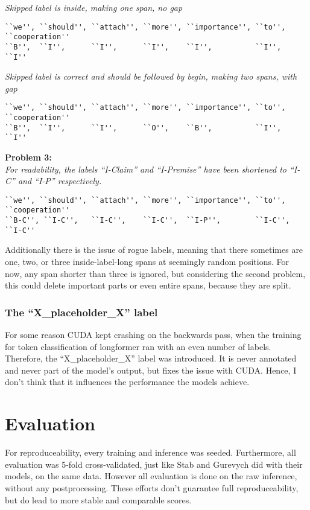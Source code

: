 \documentclass[12]{article}
\theoremstyle{mytheoremstyle}
\theoremstyle{mytheoremstyle}
\theoremstyle{myproblemstyle}
\begin{document}
  \vspace{-4ex}
  \textit{Skipped label is inside, making one span, no gap}
  \vspace{-1.5ex}
  \begin{verbatim}
``we'', ``should'', ``attach'', ``more'', ``importance'', ``to'', ``cooperation''
``B'',  ``I'',      ``I'',      ``I'',    ``I'',          ``I'',  ``I''
  \end{verbatim}
  \vspace{-4ex}
  \textit{Skipped label is correct and should be followed by begin, making two spans, with gap}
  \vspace{-1.5ex}
  \begin{verbatim}
``we'', ``should'', ``attach'', ``more'', ``importance'', ``to'', ``cooperation''
``B'',  ``I'',      ``I'',      ``O'',    ``B'',          ``I'',  ``I''
  \end{verbatim}
  \vspace{-4ex}
  \textbf{Problem 3:}\\
  \textit{For readability, the labels ``I-Claim'' and ``I-Premise'' have been shortened to ``I-C'' and ``I-P'' respectively.}
  \vspace{-1.5ex}
  \begin{verbatim}
``we'', ``should'', ``attach'', ``more'', ``importance'', ``to'', ``cooperation''
``B-C'', ``I-C'',   ``I-C'',    ``I-C'',  ``I-P'',        ``I-C'', ``I-C''
  \end{verbatim}
  \vspace{-4ex}
  Additionally there is the issue of rogue labels, meaning that there sometimes are one, two, or three inside-label-long spans at seemingly random positions. 
  For now, any span shorter than three is ignored, but considering the second problem, this could delete important parts or even entire spans, because they are split.
  \subsubsection{The ``X\_placeholder\_X'' label} \label{the placeholder label}
  For some reason CUDA kept crashing on the backwards pass, when the training for token classification of longformer ran with an even number of labels. 
  Therefore, the ``X\_placeholder\_X'' label was introduced. 
  It is never annotated and never part of the model's output, but fixes the issue with CUDA. 
  Hence, I don't think that it influences the performance the models achieve.

  \section{Evaluation\dotfill}
  For reproduceability, every training and inference was seeded. 
  Furthermore, all evaluation was 5-fold cross-validated, just like Stab and Gurevych did with their models, on the same data. 
  However all evaluation is done on the raw inference, without any postprocessing.
  These efforts don't guarantee full reproduceability, but do lead to more stable and comparable scores.
\end{document}
